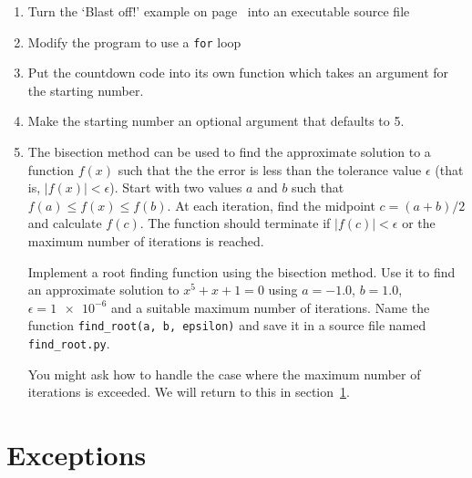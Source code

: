 \documentclass[a4paper,twoside,titlepage]{memoir}
\makeatletter
\newcommand{\FrameTitle}[2]{%
  \fboxrule=\FrameRule \fboxsep=\FrameSep
  \fbox{\vbox{\nobreak \vskip -0.7\FrameSep
    \rlap{\centerline{\strut#1}}\nobreak\nointerlineskip%
    \vskip 0.7\FrameSep
    \hbox{#2}}}}
\newenvironment{framewithtitle}[2][\FrameFirst@Lab\ (cont.)]{%
  \def\FrameFirst@Lab{\textbf{#2}}%
  \def\FrameCont@Lab{\textbf{#1}}%
  \def\FrameCommand##1{%
    \FrameTitle{\FrameFirst@Lab}{##1}}%
  \def\FirstFrameCommand##1{%
    \FrameTitle{\FrameFirst@Lab}{##1}}%
  \def\MidFrameCommand##1{%
    \FrameTitle{\FrameCont@Lab}{##1}}%
  \def\LastFrameCommand##1{%
    \FrameTitle{\FrameCont@Lab}{##1}}%
\MakeFramed{\advance\hsize-\width \FrameRestore}}%
{\endMakeFramed}
\newcounter{exercisectr}
\newenvironment{exercise}
{\refstepcounter{exercisectr}\begin{framewithtitle}{Practical \arabic{exercisectr}}}
{\end{framewithtitle}}
\newcommand{\shellcmd}{\texttt}
\makeatother
\begin{document}
\begin{exercise}
\label{ex:bisection}

\begin{enumerate}
\item Turn the `Blast off!' example on page~\pageref{blast-off} into an executable source file

\item Modify the program to use a \shellcmd{for} loop

\item Put the countdown code into its own function which takes an argument for the starting number.

\item Make the starting number an optional argument that defaults to 5.

\item The bisection method can be used to find the approximate solution to a function $f(x)$ such that the the error is less than the tolerance value $\epsilon$ (that is, $| f(x) | < \epsilon$).  Start with two values $a$ and $b$ such that $f(a) \leq f(x) \leq f(b)$.  At each iteration, find the midpoint $c = \left(a + b\right) / 2$ and calculate $f(c)$.  The function should terminate if $| f(c) | < \epsilon$ or the maximum number of iterations is reached.

Implement a root finding function using the bisection method.  Use it to find an approximate solution to $x^5 + x + 1 = 0$ using $a = -1.0$, $b = 1.0$, $\epsilon = \num{1e-6}$ and a suitable maximum number of iterations.  Name the function \shellcmd{find\_root(a, b, epsilon)} and save it in a source file named \shellcmd{find\_root.py}.

You might ask how to handle the case where the maximum number of iterations is exceeded.  We will return to this in section~\ref{sec:exceptions}.
\end{enumerate}
\end{exercise}

\section{Exceptions}
\label{sec:exceptions}
\end{document}
